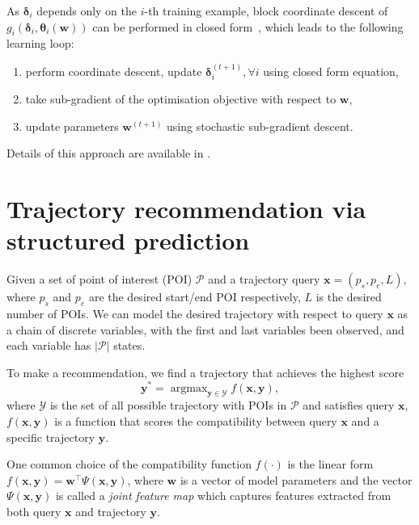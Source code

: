 \documentclass[9pt]{extarticle}
\DeclareMathOperator*{\argmax}{argmax}
\begin{document}
As $\bm{\delta}_i$ depends only on the $i$-th training example, block coordinate descent of $g_i(\bm{\delta}_i, \bm{\theta}_i(\mathbf{w}))$ 
can be performed in closed form~\cite{werner2007linear, globerson2008fixing}, 
which leads to the following learning loop:
\begin{enumerate}
\item perform coordinate descent, update $\bm{\delta}_i^{(t+1)}, \forall i$ using closed form equation,
\item take sub-gradient of the optimisation objective with respect to $\mathbf{w}$,
\item update parameters $\mathbf{w}^{(t+1)}$ using stochastic sub-gradient descent.
\end{enumerate}
Details of this approach are available in \cite{meshi2010learning}.


\section{Trajectory recommendation via structured prediction}
\label{sec:recommend}

Given a set of point of interest (POI) $\mathcal{P}$ and a trajectory query $\mathbf{x} = (p_s, p_e, L)$,
where $p_s$ and $p_e$ are the desired start/end POI respectively, $L$ is the desired number of POIs.
We can model the desired trajectory with respect to query $\mathbf{x}$ as a chain of discrete variables, 
with the first and last variables been observed, and each variable has $|\mathcal{P}|$ states.

To make a recommendation, we find a trajectory that achieves the highest score
\begin{equation*}
\mathbf{y}^* = \argmax_{\mathbf{y} \in \mathcal{Y}} f(\mathbf{x}, \mathbf{y}),
\end{equation*}
where $\mathcal{Y}$ is the set of all possible trajectory with POIs in $\mathcal{P}$ and satisfies query $\mathbf{x}$,
$f(\mathbf{x}, \mathbf{y})$ is a function that scores the compatibility between query $\mathbf{x}$ and a specific trajectory $\mathbf{y}$.

One common choice of the compatibility function $f(\cdot)$ is the linear form
$f(\mathbf{x}, \mathbf{y}) = \mathbf{w}^\top \Psi(\mathbf{x}, \mathbf{y})$,
where $\mathbf{w}$ is a vector of model parameters and 
the vector $\Psi(\mathbf{x}, \mathbf{y})$ is called a \emph{joint feature map} 
which captures features extracted from both query $\mathbf{x}$ and trajectory $\mathbf{y}$.
\end{document}
